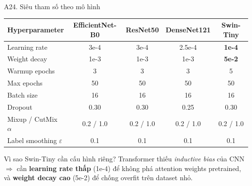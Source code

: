 \documentclass[10pt, aspectratio=169]{beamer}
\begin{document}
\begin{frame}{A24. Siêu tham số theo mô hình}
    \scriptsize
    \begin{table}[]
        \centering
        \begin{tabular}{lcccc}
        \toprule
        \rowcolor{usthblue!25}
        \textbf{Hyperparameter} & \textbf{EfficientNet-B0} & \textbf{ResNet50} & \textbf{DenseNet121} & \textbf{Swin-Tiny} \\
        \midrule
        Learning rate       & 3e-4  & 3e-4 & 2.5e-4 & \textbf{1e-4} \\
        Weight decay        & 1e-3  & 1e-3 & 1e-3   & \textbf{5e-2} \\
        Warmup epochs       & 3     & 3    & 3      & 5 \\
        Max epochs          & 50    & 50   & 50     & 50 \\
        Batch size          & 16    & 16   & 16     & 16 \\
        Dropout             & 0.30  & 0.30 & 0.25   & 0.30 \\
        Mixup / CutMix $\alpha$ & 0.2 / 1.0 & 0.2 / 1.0 & 0.2 / 1.0 & 0.2 / 1.0 \\
        Label smoothing $\varepsilon$ & 0.1 & 0.1 & 0.1 & 0.1 \\
        \bottomrule
        \end{tabular}
    \end{table}

    \vspace{0.3cm}
    \begin{block}{Vì sao Swin-Tiny cần cấu hình riêng?}
        \footnotesize
        Transformer thiếu \textit{inductive bias} của CNN $\Rightarrow$ cần \textbf{learning rate thấp} (1e-4) để không phá attention weights pretrained, và \textbf{weight decay cao} (5e-2) để chống overfit trên dataset nhỏ.
    \end{block}
\end{frame}
\end{document}
